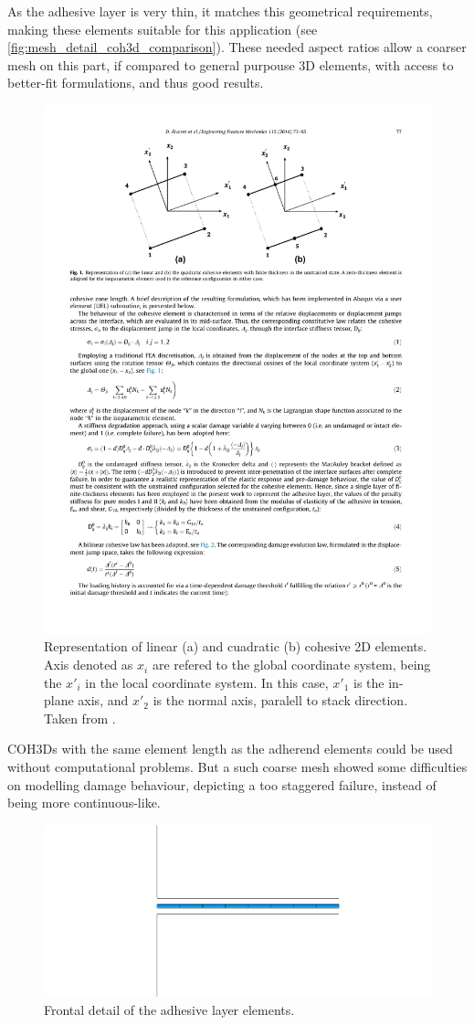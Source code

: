 \documentclass[
documentsize = a4, %
font = cmr, %
typesize = 11, %
printmode = true,
onehalfspacing = true,
language = en, %
titlepage = udciccp, %
degree = pt, %
dedication = true,
acknowledgements = true,
abstract-en = true,
abstract-es = false,
abstract-ga = false,
epigraphs = true,
toc = true,
lof = true,
lot = true,
frontmatterintoc = false,
notation = false,
minimal = false,
]{UDCthesis}
\begin{document}
As the adhesive layer is very thin, it matches this geometrical requirements, making these elements suitable for this application (see \cref{fig:mesh_detail_coh3d_comparison}). These needed aspect ratios allow a coarser mesh on this part, if compared to general purpouse 3D elements, with access to better-fit formulations, and thus good results.

\begin{figure}
	\centering
	\includegraphics[width=0.7\linewidth]{IMG_CUTRES/coh3d_csys}
	\caption[Representation of linear and cuadratic cohesive 2D elements.]{Representation of linear (a) and cuadratic (b) cohesive 2D elements. Axis denoted as $x_{i}$ are refered to the global coordinate system, being the $x'_{i}$ in the local coordinate system. In this case, $x'_{1}$ is the in-plane axis, and $x'_{2}$ is the normal axis, paralell to stack direction. Taken from \citet{Alvarez2014}.}
	\label{fig:coh3d_csys}
\end{figure}

\Glspl{COH3D} with the same element length as the adherend elements could be used without computational problems. But a such coarse mesh showed some difficulties on modelling damage behaviour, depicting a too staggered failure, instead of being more continuous-like.

\begin{figure}
\centering
\includegraphics[width=0.7\linewidth]{IMG_CUTRES/ads_detail}
\caption{Frontal detail of the adhesive layer elements.}
\label{fig:ads_detail}
\end{figure}
\end{document}
